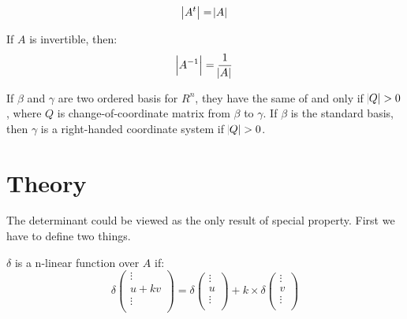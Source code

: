 \begin{theorem}
    \begin{equation}
        \abs{A^t} = \abs{A}
    \end{equation}    
\end{theorem}

\begin{theorem}
    If $A$ is invertible, then:
    \begin{equation}
        \abs{{A}^{-1}} = \frac{1}{\abs{A}}
    \end{equation}    
\end{theorem}




\begin{definition}
    If $\beta$ and $\gamma$ are two ordered basis for $R^n$, they have the same  of and only if $\abs{Q} > 0$, where $Q$ is change-of-coordinate matrix from $\beta$ to $\gamma$. If $\beta$ is the standard basis, then $\gamma$ is a right-handed coordinate system if $\abs{Q} > 0$.
\end{definition}


\section{Theory}

The determinant could be viewed as the only result of special property. First we have to define two things.

\begin{definition}
    $\delta$ is a n-linear function over $A$ if:
    \begin{equation}
        \delta \begin{pmatrix}
            \vdots \\
            u + kv \\
            \vdots \\
        \end{pmatrix} = \delta \begin{pmatrix}
            \vdots \\
            u \\
            \vdots \\
        \end{pmatrix} + k \times \delta \begin{pmatrix}
            \vdots \\
            v \\
            \vdots \\
        \end{pmatrix} 
    \end{equation}
\end{definition}


